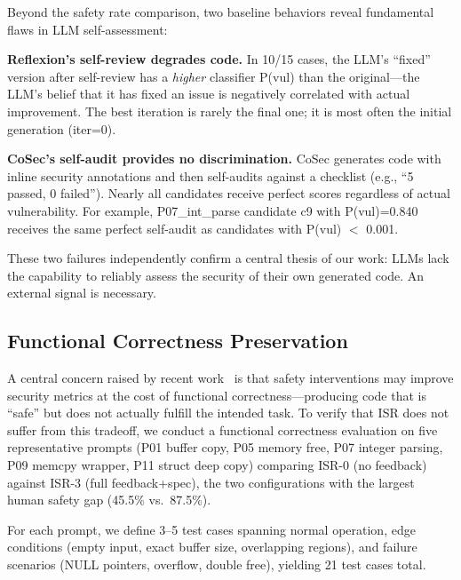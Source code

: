 \documentclass[10pt,conference]{IEEEtran}
\begin{document}
Beyond the safety rate comparison, two baseline behaviors reveal fundamental flaws in LLM self-assessment:

\textbf{Reflexion's self-review degrades code.} In 10/15 cases, the LLM's ``fixed'' version after self-review has a \textit{higher} classifier P(vul) than the original---the LLM's belief that it has fixed an issue is negatively correlated with actual improvement. The best iteration is rarely the final one; it is most often the initial generation (iter=0).

\textbf{CoSec's self-audit provides no discrimination.} CoSec generates code with inline security annotations and then self-audits against a checklist (e.g., ``5 passed, 0 failed''). Nearly all candidates receive perfect scores regardless of actual vulnerability. For example, P07\_int\_parse candidate c9 with P(vul)=0.840 receives the same perfect self-audit as candidates with P(vul) $<$ 0.001.

These two failures independently confirm a central thesis of our work: LLMs lack the capability to reliably assess the security of their own generated code. An external signal is necessary.

\subsection{Functional Correctness Preservation}
\label{sec:functional}

A central concern raised by recent work~\cite{rethinking} is that safety interventions may improve security metrics at the cost of functional correctness---producing code that is ``safe'' but does not actually fulfill the intended task. To verify that ISR does not suffer from this tradeoff, we conduct a functional correctness evaluation on five representative prompts (P01 buffer copy, P05 memory free, P07 integer parsing, P09 memcpy wrapper, P11 struct deep copy) comparing ISR-0 (no feedback) against ISR-3 (full feedback+spec), the two configurations with the largest human safety gap (45.5\% vs.\ 87.5\%).

For each prompt, we define 3--5 test cases spanning normal operation, edge conditions (empty input, exact buffer size, overlapping regions), and failure scenarios (NULL pointers, overflow, double free), yielding 21 test cases total.
\end{document}
